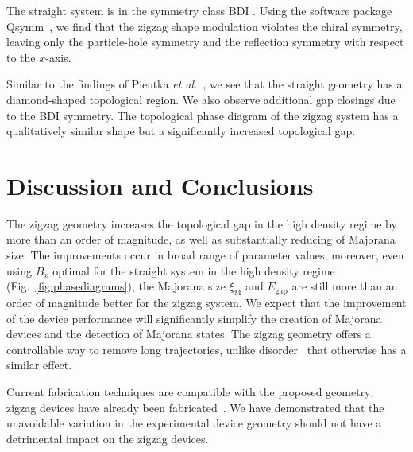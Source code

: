 \documentclass[english, twocolumn, 10pt, aps, superscriptaddress, floatfix, prb, citeautoscript]{revtex4-1}
\renewcommand{\comment}[2]{#2}
\begin{document}
\comment{The introduction ofa the zigzag breaks a chiral symmetry, bringing the system from the BDI to the D symmetry class}
The straight system is in the symmetry class BDI \cite{pientka2017topological}.
Using the software package Qsymm~\cite{varjas2018qsymm}, we find that the zigzag shape modulation violates the chiral symmetry, leaving only the particle-hole symmetry and the reflection symmetry with respect to the $x$-axis.

\comment{The phase diagram does not change much, except we see a cleaner spectrum as a result of the D class symmetry.}
Similar to the findings of Pientka \textit{et al.}~\cite{pientka2017topological}, we see that the straight geometry has a diamond-shaped topological region.
We also observe additional gap closings due to the BDI symmetry.
The topological phase diagram of the zigzag system has a qualitatively similar shape but a significantly increased topological gap.

\section{Discussion and Conclusions}

\comment{The zigzag geometry is a controllable tool in hardening the gap and decreasing Majorana size.}
The zigzag geometry increases the topological gap in the high density regime by more than an order of magnitude, as well as substantially reducing of Majorana size.
The improvements occur in broad range of parameter values, moreover, even using $B_x$ optimal for the straight system in the high density regime (Fig.~\ref{fig:phasediagrams}), the Majorana size $\xi_\textrm{M}$ and $E_\textrm{gap}$ are still more than an order of magnitude better for the zigzag system.
We expect that the improvement of the device performance will significantly simplify the creation of Majorana devices and the detection of Majorana states.
The zigzag geometry offers a controllable way to remove long trajectories, unlike disorder~\cite{haim_double-edge_2018} that otherwise has a similar effect.

\comment{Current fabrication techniques are compatible with the proposed geometry, and experimental verification can be near.}
Current fabrication techniques are compatible with the proposed geometry; zigzag devices have already been fabricated~\cite{fokko_zigzag}.
We have demonstrated that the unavoidable variation in the experimental device geometry should not have a detrimental impact on the zigzag devices.
\end{document}
